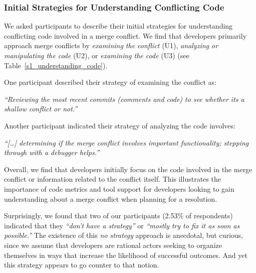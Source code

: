\subsubsection{Initial Strategies for Understanding Conflicting Code}

We asked participants to describe their initial strategies for understanding conflicting code involved in a merge conflict.
We find that developers primarily approach merge conflicts by \textit{examining the conflict} (U1), \textit{analyzing or manipulating the code} (U2), or \textit{examining the code} (U3) (see Table~\ref{s1_understanding_code}).

One participant described their strategy of examining the conflict as:
\begin{quoting}
\textit{``Reviewing the most recent commits (comments and code) to see whether its a shallow conflict or not.''}
\end{quoting}
Another participant indicated their strategy of analyzing the code involves:
\begin{quoting}
\textit{``[\ldots] determining if the merge conflict involves important functionality; stepping through with a debugger helps.''}
\end{quoting}
Overall, we find that developers initially focus on the code involved in the merge conflict or information related to the conflict itself.
This illustrates the importance of code metrics and tool support for developers looking to gain understanding about a merge conflict when planning for a resolution.

Surprisingly, we found that two of our participants (2.53\% of respondents) indicated that they \textit{``don't have a strategy''} or \textit{``mostly try to fix it as soon as possible.''}
The existence of this \textit{no strategy} approach is anecdotal, but curious, since we assume that developers are rational actors seeking to organize themselves in ways that increase the likelihood of successful outcomes.
And yet this strategy appears to go counter to that notion.

